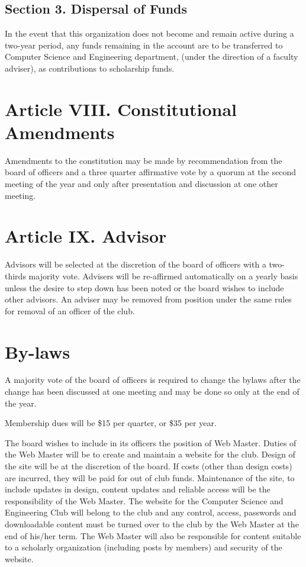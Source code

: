 \documentclass{article}
\begin{document}
  \subsection{Section 3. Dispersal of Funds}
    In the event that this organization does not become and remain active during a two-year period, any funds remaining in the account are to be transferred to Computer Science and Engineering department, (under the direction of a faculty adviser), as contributions to scholarship funds.

\section{Article VIII. Constitutional Amendments}
  Amendments to the constitution may be made by recommendation from the board of officers and a three quarter affirmative vote by a quorum at the second meeting of the year and only after presentation and discussion at one other meeting.

\section{Article IX. Advisor}
  Advisors will be selected at the discretion of the board of officers with a two-thirds majority vote. Advisers will be re-affirmed automatically on a yearly basis unless the desire to step down has been noted or the board wishes to include other advisors. An adviser may be removed from position under the same rules for removal of an officer of the club.

\section{\large By-laws}
  A majority vote of the board of officers is required to change the bylaws after the change has been discussed at one meeting and may be done so only at the end of the year.

  Membership dues will be \$15 per quarter, or \$35 per year.

  The board wishes to include in its officers the position of Web Master. Duties of the Web Master will be to create and maintain a website for the club. Design of the site will be at the discretion of the board. If costs (other than design costs) are incurred, they will be paid for out of club funds. Maintenance of the site, to include updates in design, content updates and reliable access will be the responsibility of the Web Master. The website for the Computer Science and Engineering Club will belong to the club and any control, access, passwords and downloadable content must be turned over to the club by the Web Master at the end of his/her term. The Web Master will also be responsible for content suitable to a scholarly organization (including posts by members) and security of the website.
\end{document}
